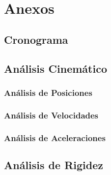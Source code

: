 \chapter{Anexos}
\section{Cronograma}
\label{Anexo:CronogramaCompleto}


\section{Análisis Cinemático}
\subsection{Análisis de Posiciones}
\label{Anexo:AnalisisdePosiciones}


\subsection{Análisis de Velocidades}


\subsection{Análisis de Aceleraciones}


\section{Análisis de Rigidez}

